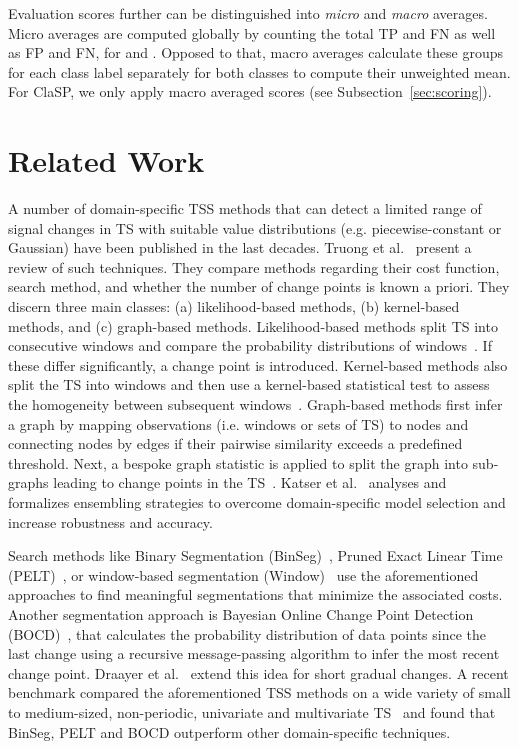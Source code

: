 \documentclass[pdflatex,sn-basic]{sn-jnl}
\begin{document}
Evaluation scores further can be distinguished into \emph{micro} and \emph{macro} averages. Micro averages are computed globally by counting the total TP and FN as well as FP and FN, for  and . Opposed to that, macro averages calculate these groups for each class label separately for both classes to compute their unweighted mean. For ClaSP, we only apply macro averaged scores (see Subsection~\ref{sec:scoring}). 


\section{Related Work}\label{sec:related_work}

A number of domain-specific TSS methods that can detect a limited range of signal changes in TS with suitable value distributions (e.g. piecewise-constant or Gaussian) have been published in the last decades. Truong et al.~\citep{truong2020selective} present a review of such techniques. They compare methods regarding their cost function, search method, and whether the number of change points is known a priori. They discern three main classes: (a) likelihood-based methods, (b) kernel-based methods, and (c) graph-based methods. Likelihood-based methods split TS into consecutive windows and compare the probability distributions of windows~\citep{kawahara2012sequential}. If these differ significantly, a change point is introduced. Kernel-based methods also split the TS into windows and then use a kernel-based statistical test to assess the homogeneity between subsequent windows~\citep{harchaoui2009regularized}. Graph-based methods first infer a graph by mapping observations (i.e. windows or sets of TS) to nodes and connecting nodes by edges if their pairwise similarity exceeds a predefined threshold. Next, a bespoke graph statistic is applied to split the graph into sub-graphs leading to change points in the TS~\citep{chen2015graph}. Katser et al.~\citep{Katser2021UnsupervisedOC} analyses and formalizes ensembling strategies to overcome domain-specific model selection and increase robustness and accuracy. 

Search methods like Binary Segmentation (BinSeg)~\citep{Sen1975OnTF}, Pruned Exact Linear Time (PELT)~\citep{Killick2012OptimalDO}, or window-based segmentation (Window)~\citep{truong2020selective} use the aforementioned approaches to find meaningful segmentations that minimize the associated costs. Another segmentation approach is Bayesian Online Change Point Detection (BOCD)~\citep{adams2007bayesian}, that calculates the probability distribution of data points since the last change using a recursive message-passing algorithm to infer the most recent change point. Draayer et al.~\citep{Draayer2021ReevaluatingTC} extend this idea for short gradual changes. A recent benchmark compared the aforementioned TSS methods on a wide variety of small to medium-sized, non-periodic, univariate and multivariate TS~\citep{van2020evaluation} and found that BinSeg, PELT and BOCD outperform other domain-specific techniques. 
\end{document}
